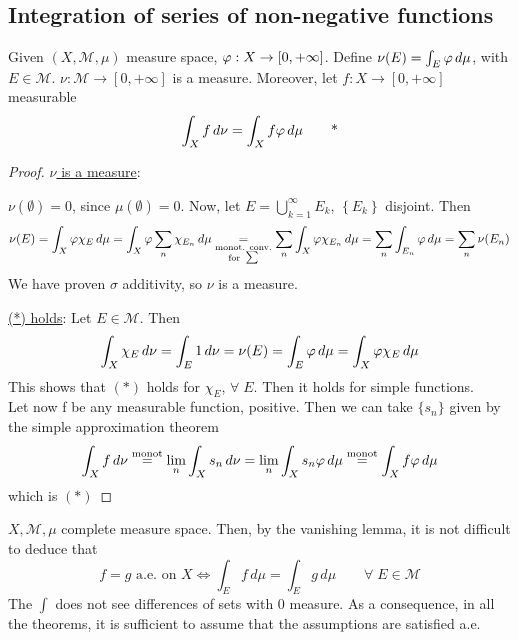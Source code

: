 \subsection{Integration of series of non-negative functions}
\begin{theorem}
    Given \((X, \mathcal{M}, \mu)\) measure space, \(\oldphi : X \to [0, +\infty]\). Define \(\nu(E) = \int_E \oldphi \, d\mu\), with \(E \in \mathcal{M}\). 
    \(\nu : \mathcal{M} \to [0, +\infty]\) is a measure. Moreover, let \(f:X \to [0, +\infty]\) measurable
    \[
        \int_X f \, d\nu = \int_X f\oldphi \, d\mu \tag*{*}
    \]
\end{theorem}
\begin{proof}
    \noindent\underline{\(\nu\) is a measure}:  

    \(\nu(\emptyset) = 0\), since \(\mu(\emptyset) = 0\). 
    Now, let \(E = \bigcup_{k=1}^{\infty} E_k\), \(\left\{ E_k \right\}\) disjoint. Then 
    \[
        \nu(E) = \int_X \oldphi\chi_{E} \, d\mu = \int_X \oldphi\sum_n \chi_{E_n} \, d\mu \underset{\substack{\text{\scriptsize{monot. conv.}} \\ 
            \text{\scriptsize{for }}\textstyle\sum}}{=}  \sum_n \int_X \oldphi \chi_{E_n} \, d\mu = \sum_n \int_{E_n} \oldphi \, d\mu = \sum_n \nu(E_n) 
    \]
    We have proven \(\sigma\) additivity, so \(\nu\) is a measure.

    \noindent\underline{(*) holds}:
    Let \(E \in \mathcal{M}\). Then
    \[
        \int_X \chi_E \, d\nu = \int_E 1 \, d\nu = \nu(E)  = \int_E \oldphi \, d\mu = \int_X \oldphi \chi_E \, d\mu
    \]
    This shows that \((*)\) holds for \(\chi_E\), \(\forall \; E\). Then it holds for simple functions. \\
    Let now f be any measurable function, positive. Then we can take \(\{s_n\}\) given by the simple approximation theorem
    \[
        \int_X f \, d\nu \overset{\text{monot}}{=} \lim_n \int_X s_n \, d\nu = \lim_n \int_X s_n \oldphi \, d\mu \overset{\text{monot}}{=} \int_X f \oldphi \, d\mu 
    \]
    which is \((*)\) 
\end{proof}

\begin{remark}
    \(X, \mathcal{M}, \mu\) complete measure space. Then, by the vanishing lemma, it is not difficult to deduce that 
    \[
        f=g \text{ a.e. on } X \Leftrightarrow \int_E f \, d\mu = \int_E g \, d\mu \qquad \forall\; E \in \mathcal{M}
    \]
    The \(\int\) does not see differences of sets with 0 measure. As a consequence, in all the theorems, it is sufficient to assume that the assumptions are satisfied a.e. 
\end{remark}


